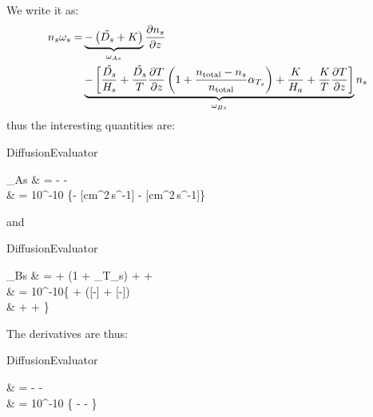 We write it as:
\begin{equation}
\begin{split}
n_s\omega_s = & \underbrace{- \left( \tilde{D_s} + K \right)}_{\omega_{As}} \frac{\partial n_s}{\partial z} \\
                  & \underbrace{- \left[
                                    \frac{\tilde{D_s}}{H_s} + \frac{\tilde{D_s}}{T}\frac{\partial T}{\partial z}\left(1 + \frac{n_\text{total} - n_s}{n_\text{total}}\alpha_{T_s}\right)
                                  + \frac{K}{H_a} + \frac{K}{T}\frac{\partial T}{\partial z}
                    \right]}_{\omega_{Bs}}n_s \\
\end{split}
\end{equation}
thus the interesting quantities are:
\begin{equationCode}{DiffusionEvaluator}
\begin{split}
\omega_{As} &  = - - \eddy \\[5pt]
\uu [km^2\,s^{-1}] & \uu = 10^{-10} \left\{- [cm^2\,s^{-1}] - [cm^2\,s^{-1}]\right\}
\end{split}
\end{equationCode}
and
\begin{equationCode}{DiffusionEvaluator}
\begin{split}
\omega_{Bs} & =  + \left(1 + \thermcoef_{T_s}\right)
                               +  +  \\[5pt]
\uu [km\,s^{-1}] & \uu = 10^{-10}\Bigg\{\frac{[cm^2\,s^{-1}]}{[km]} + \frac{[cm^2\,s^{-1}]}{[K]}\frac{[K]}{[km]}\left([-] + \frac{[cm^{-3}] - [cm^{-3}]}{[cm^{-3}]}[-]\right) \\
                 & \uu \fakeequalspace   + \frac{[cm^2\,s^{-1}]}{[km]} + \frac{[cm^2\,s^{-1}]}{[K]}\frac{[K]}{[km]} \Bigg\}
\end{split}
\end{equationCode}
The derivatives are thus:
\begin{equationCode}{DiffusionEvaluator}
\begin{split}
        & = - -   \\
\uu \frac{[km^2\,s^{-1}]}{[cm^{-3}]} & \uu = 10^{-10} \left\{ - \frac{[cm^2\,s^{-1}]}{[cm^{-3}]} - \frac{[cm^2\,s^{-1}]}{[cm^{-3}]} \right\}
\end{split}
\end{equationCode}
